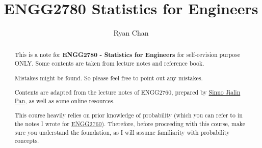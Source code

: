 \documentclass[a4paper]{report}
\author{Ryan Chan}
\title{ENGG2780 Statistics for Engineers}
\begin{document}
\setlength\parindent{0pt}

\maketitle

\newpage

\begin{abstract}
	This is a note for \textbf{ENGG2780 - Statistics for Engineers} for self-revision purpose ONLY. Some contents are taken from lecture notes and reference book.
	
	Mistakes might be found. So please feel free to point out any mistakes.
	
	Contents are adapted from the lecture notes of ENGG2760, prepared by \href{https://www.cse.cuhk.edu.hk/~sinnopan/}{Sinno Jialin Pan}, as well as some online resources.

	This course heavily relies on prior knowledge of probability (which you can refer to in the notes I wrote for \href{https://www.ryanc.wtf/files/ENGG2760.pdf}{ENGG2760}). Therefore, before proceeding with this course, make sure you understand the foundation, as I will assume familiarity with probability concepts.
\end{abstract}

\newpage

\tableofcontents

\setlength{\parskip}{5pt}
\end{document}
